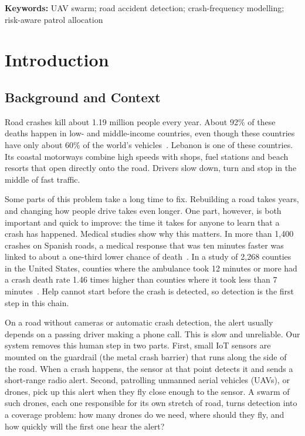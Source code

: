 \documentclass[11pt]{article}
\begin{document}
\noindent\textbf{Keywords:} UAV swarm; road accident detection;
crash-frequency modelling; risk-aware patrol allocation

\section{Introduction}

\subsection{Background and Context}

Road crashes kill about 1.19 million people every year. About 92\% of these
deaths happen in low- and middle-income countries, even though these countries
have only about 60\% of the world's vehicles~\cite{who2023}. Lebanon is one of
these countries. Its coastal motorways combine high speeds with shops, fuel
stations and beach resorts that open directly onto the road. Drivers slow down,
turn and stop in the middle of fast traffic.

Some parts of this problem take a long time to fix. Rebuilding a road takes
years, and changing how people drive takes even longer. One part, however, is
both important and quick to improve: the time it takes for anyone to learn that
a crash has happened. Medical studies show why this matters. In more than
1{,}400 crashes on Spanish roads, a medical response that was ten minutes
faster was linked to about a one-third lower chance of death~\cite{sanchez2010}.
In a study of 2{,}268 counties in the United States, counties where the
ambulance took 12 minutes or more had a crash death rate 1.46 times higher than
counties where it took less than 7 minutes~\cite{byrne2019}. Help cannot start
before the crash is detected, so detection is the first step in this chain.

On a road without cameras or automatic crash detection, the alert usually
depends on a passing driver making a phone call. This is slow and unreliable.
Our system removes this human step in two parts. First, small IoT sensors are
mounted on the guardrail (the metal crash barrier) that runs along the side of
the road. When a crash happens, the sensor at that point detects it and sends a
short-range radio alert. Second, patrolling unmanned aerial vehicles (UAVs), or
drones, pick up this alert when they fly close enough to the sensor. A swarm of
such drones, each one responsible for its own stretch of road, turns detection
into a coverage problem: how many drones do we need, where should they fly, and
how quickly will the first one hear the alert?
\end{document}
